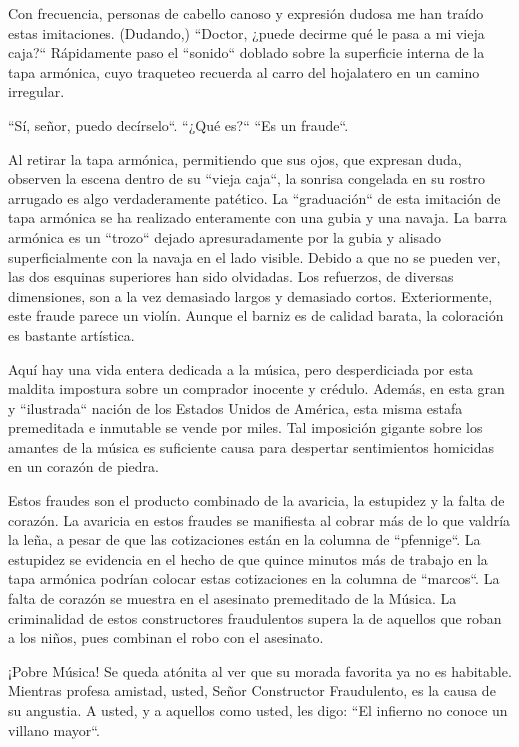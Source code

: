 \documentclass[12pt]{book}
\begin{document}
Con frecuencia, personas de cabello canoso y expresión dudosa me han traído estas imitaciones. (Dudando,) ``Doctor, ¿puede decirme qué le pasa a mi vieja caja?`` Rápidamente paso el ``sonido`` doblado sobre la superficie interna de la tapa armónica, cuyo traqueteo recuerda al carro del hojalatero en un camino irregular.

``Sí, señor, puedo decírselo``. ``¿Qué es?`` ``Es un fraude``.

Al retirar la tapa armónica, permitiendo que sus ojos, que expresan duda, observen la escena dentro de su ``vieja caja``, la sonrisa congelada en su rostro arrugado es algo verdaderamente patético. La ``graduación`` de esta imitación de tapa armónica se ha realizado enteramente con una gubia y una navaja. La barra armónica es un ``trozo`` dejado apresuradamente por la gubia y alisado superficialmente con la navaja en el lado visible. Debido a que no se pueden ver, las dos esquinas superiores han sido olvidadas. Los refuerzos, de diversas dimensiones, son a la vez demasiado largos y demasiado cortos. Exteriormente, este fraude parece un violín. Aunque el barniz es de calidad barata, la coloración es bastante artística.

Aquí hay una vida entera dedicada a la música, pero desperdiciada por esta maldita impostura sobre un comprador inocente y crédulo. Además, en esta gran y ``ilustrada`` nación de los Estados Unidos de América, esta misma estafa premeditada e inmutable se vende por miles. Tal imposición gigante sobre los amantes de la música es suficiente causa para despertar sentimientos homicidas en un corazón de piedra.

Estos fraudes son el producto combinado de la avaricia, la estupidez y la falta de corazón. La avaricia en estos fraudes se manifiesta al cobrar más de lo que valdría la leña, a pesar de que las cotizaciones están en la columna de ``pfennige``. La estupidez se evidencia en el hecho de que quince minutos más de trabajo en la tapa armónica podrían colocar estas cotizaciones en la columna de ``marcos``. La falta de corazón se muestra en el asesinato premeditado de la Música. La criminalidad de estos constructores fraudulentos supera la de aquellos que roban a los niños, pues combinan el robo con el asesinato.\newline

¡Pobre Música! Se queda atónita al ver que su morada favorita ya no es habitable. Mientras profesa amistad, usted, Señor Constructor Fraudulento, es la causa de su angustia. A usted, y a aquellos como usted, les digo: ``El infierno no conoce un villano mayor``.\newline
\end{document}
